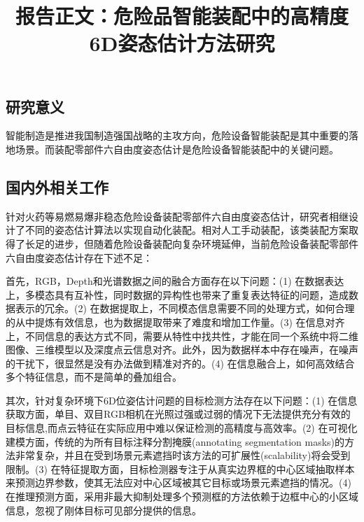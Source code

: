 \documentclass[12pt]{article}
\begin{document}

\title{报告正文：危险品智能装配中的高精度6D姿态估计方法研究}

\maketitle







\subsection{研究意义}

智能制造是推进我国制造强国战略的主攻方向，危险设备智能装配是其中重要的落地场景。而装配零部件六自由度姿态估计是危险设备智能装配中的关键问题。


\subsection{国内外相关工作}

针对火药等易燃易爆非稳态危险设备装配零部件六自由度姿态估计，研究者相继设计了不同的姿态估计算法以实现自动化装配。相对人工手动装配，该类装配方案取得了长足的进步，但随着危险设备装配向复杂环境延伸，当前危险设备装配零部件六自由度姿态估计存在下述不足：

首先，RGB，Depth和光谱数据之间的融合方面存在以下问题：(1) 在数据表达上，多模态具有互补性，同时数据的异构性也带来了重复表达特征的问题，造成数据表示的冗余。(2) 在数据提取上，不同模态信息需要不同的处理方式，如何合理的从中提炼有效信息，也为数据提取带来了难度和增加工作量。(3) 在信息对齐上，不同信息的表达方式不同，需要从特性中找共性，才能在同一个系统中将二维图像、三维模型以及深度点云信息对齐。此外，因为数据样本中存在噪声，在噪声的干扰下，很显然是没有办法做到精准对齐的。(4) 在信息融合上，如何高效结合多个特征信息，而不是简单的叠加组合。 

其次，针对复杂环境下6D位姿估计问题的目标检测方法存在以下问题：(1) 在信息获取方面，单目、双目RGB相机在光照过强或过弱的情况下无法提供充分有效的目标信息,而点云特征在实际应用中难以保证检测的高精度与高效率。(2) 在可视化建模方面，传统的为所有目标注释分割掩膜(annotating segmentation masks)的方法非常复杂，并且在受到场景元素遮挡时该方法的可扩展性(scalability)将会受到限制。(3) 在特征提取方面，目标检测器专注于从真实边界框的中心区域抽取样本来预测边界参数，使其无法应对中心区域被其它目标或场景元素遮挡的情况。(4) 在推理预测方面，采用非最大抑制处理多个预测框的方法依赖于边框中心的小区域信息，忽视了刚体目标可见部分提供的信息。
\end{document}
